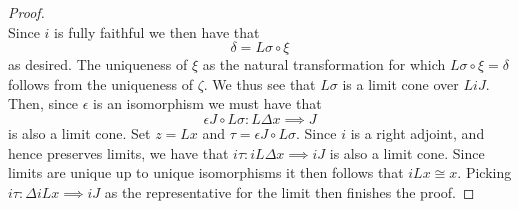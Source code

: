 \begin{proof}
\begin{equation}
  \end{equation}
  Since $ i $ is fully faithful we then have that
  \begin{equation}
    \delta = L\sigma \circ \xi
  \end{equation}
  as desired. The uniqueness of $ \xi $ as the natural transformation for which $ L\sigma \circ \xi = \delta $ follows from the uniqueness of $ \zeta $. We thus see that $ L\sigma $ is a limit cone over $ LiJ $. Then, since $ \epsilon $ is an isomorphism we must have that
  \begin{equation}
    \epsilon J \circ L \sigma: L\Delta x \implies J
  \end{equation}
  is also a limit cone. Set $ z = Lx $ and $ \tau = \epsilon J \circ L \sigma $. Since $ i $ is a right adjoint, and hence preserves limits, we have that $ i\tau: iL\Delta x \implies iJ $ is also a limit cone. Since limits are unique up to unique isomorphisms it then follows that $ iLx \cong x $. Picking $ i\tau:\Delta iLx \implies iJ $ as the representative for the limit then finishes the proof.
\end{proof}

